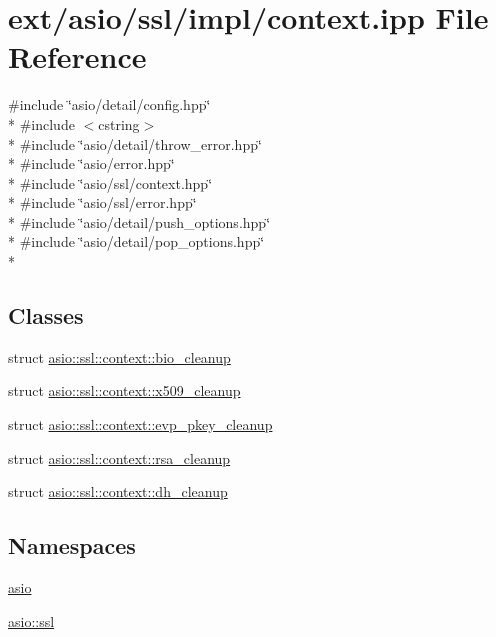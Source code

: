 \hypertarget{context_8ipp}{}\section{ext/asio/ssl/impl/context.ipp File Reference}
\label{context_8ipp}
{\ttfamily \#include \char`\"{}asio/detail/config.\+hpp\char`\"{}}\\*
{\ttfamily \#include $<$cstring$>$}\\*
{\ttfamily \#include \char`\"{}asio/detail/throw\+\_\+error.\+hpp\char`\"{}}\\*
{\ttfamily \#include \char`\"{}asio/error.\+hpp\char`\"{}}\\*
{\ttfamily \#include \char`\"{}asio/ssl/context.\+hpp\char`\"{}}\\*
{\ttfamily \#include \char`\"{}asio/ssl/error.\+hpp\char`\"{}}\\*
{\ttfamily \#include \char`\"{}asio/detail/push\+\_\+options.\+hpp\char`\"{}}\\*
{\ttfamily \#include \char`\"{}asio/detail/pop\+\_\+options.\+hpp\char`\"{}}\\*
\subsection*{Classes}
\begin{DoxyCompactItemize}
\item 
struct \hyperlink{structasio_1_1ssl_1_1context_1_1bio__cleanup}{asio\+::ssl\+::context\+::bio\+\_\+cleanup}
\item 
struct \hyperlink{structasio_1_1ssl_1_1context_1_1x509__cleanup}{asio\+::ssl\+::context\+::x509\+\_\+cleanup}
\item 
struct \hyperlink{structasio_1_1ssl_1_1context_1_1evp__pkey__cleanup}{asio\+::ssl\+::context\+::evp\+\_\+pkey\+\_\+cleanup}
\item 
struct \hyperlink{structasio_1_1ssl_1_1context_1_1rsa__cleanup}{asio\+::ssl\+::context\+::rsa\+\_\+cleanup}
\item 
struct \hyperlink{structasio_1_1ssl_1_1context_1_1dh__cleanup}{asio\+::ssl\+::context\+::dh\+\_\+cleanup}
\end{DoxyCompactItemize}
\subsection*{Namespaces}
\begin{DoxyCompactItemize}
\item 
 \hyperlink{namespaceasio}{asio}
\item 
 \hyperlink{namespaceasio_1_1ssl}{asio\+::ssl}
\end{DoxyCompactItemize}
